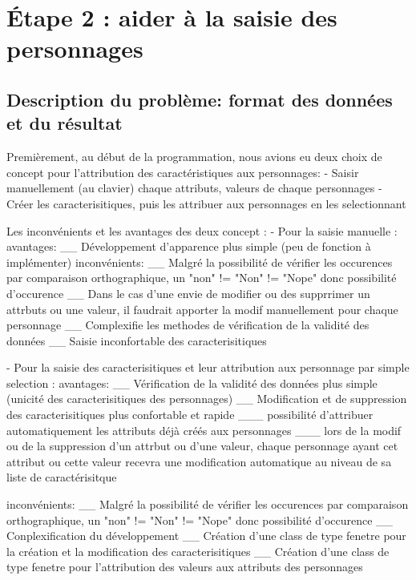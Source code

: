 \section{Étape 2 : aider  à la saisie  des personnages}
\subsection{Description du problème: format des données et du résultat}
\begin{}
    Premièrement, au début de la programmation, nous avions eu deux choix de concept pour l'attribution des caractéristiques aux personnages:
        - Saisir manuellement (au clavier) chaque attributs, valeurs de chaque personnages
        - Créer les caracterisitiques, puis les attribuer aux personnages en les selectionnant 

    Les inconvénients et les avantages des deux concept : 
        - Pour la saisie manuelle :
            avantages: 
                \__ Développement d'apparence plus simple (peu de fonction à implémenter)
            inconvénients:
                \__ Malgré la possibilité de vérifier les occurences par comparaison orthographique, un "non" != "Non" != "Nope"
                    donc possibilité d'occurence
                \__ Dans le cas d'une envie de modifier ou des supprrimer un attrbuts ou une valeur, il faudrait apporter 
                    la modif manuellement pour chaque personnage
                \__ Complexifie les methodes de vérification de la validité des données
                \__ Saisie inconfortable des caracterisitiques

        - Pour la saisie des caracterisitiques et leur attribution aux personnage par simple selection :
            avantages: 
                \__ Vérification de la validité des données plus simple (unicité des caracterisitiques des personnages)
                \__ Modification et de suppression des caracterisitiques plus confortable et rapide
                    \___ possibilité d'attribuer automatiquement les attributs déjà créés aux personnages
                    \___ lors de la modif ou de la suppression d'un attrbut ou d'une valeur, chaque personnage ayant cet attribut
                         ou cette valeur recevra une modification automatique au niveau de sa liste de caractérisitque 
            
            inconvénients:
                \__ Malgré la possibilité de vérifier les occurences par comparaison orthographique, un "non" != "Non" != "Nope"
                    donc possibilité d'occurence
                \__ Conplexification du développement 
                    \__ Création d'une class de type fenetre pour la création et la modification des caracterisitiques
                    \__ Création d'une class de type fenetre pour l'attribution des valeurs aux attributs des personnages
                

\end{}
